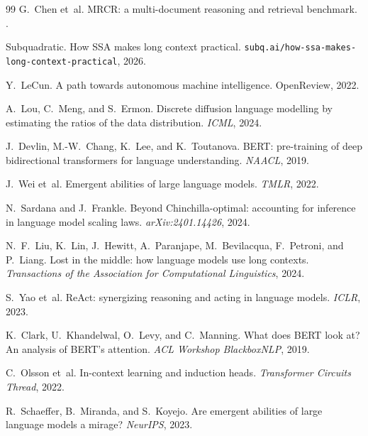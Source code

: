 \begin{thebibliography}{99}
G.~Chen et~al.
\newblock MRCR: a multi-document reasoning and retrieval benchmark.
.

Subquadratic.
\newblock How SSA makes long context practical.
\newblock \texttt{subq.ai/how-ssa-makes-long-context-practical}, 2026.

Y.~LeCun.
\newblock A path towards autonomous machine intelligence.
\newblock OpenReview, 2022.

A.~Lou, C.~Meng, and S.~Ermon.
\newblock Discrete diffusion language modelling by estimating the ratios of
  the data distribution.
\newblock \emph{ICML}, 2024.

J.~Devlin, M.-W.~Chang, K.~Lee, and K.~Toutanova.
\newblock BERT: pre-training of deep bidirectional transformers for language understanding.
\newblock \emph{NAACL}, 2019.

J.~Wei et~al.
\newblock Emergent abilities of large language models.
\newblock \emph{TMLR}, 2022.

N.~Sardana and J.~Frankle.
\newblock Beyond Chinchilla-optimal: accounting for inference in language model scaling laws.
\newblock \emph{arXiv:2401.14426}, 2024.

N.~F.~Liu, K.~Lin, J.~Hewitt, A.~Paranjape, M.~Bevilacqua, F.~Petroni, and P.~Liang.
\newblock Lost in the middle: how language models use long contexts.
\newblock \emph{Transactions of the Association for Computational Linguistics}, 2024.

S.~Yao et~al.
\newblock ReAct: synergizing reasoning and acting in language models.
\newblock \emph{ICLR}, 2023.

K.~Clark, U.~Khandelwal, O.~Levy, and C.~Manning.
\newblock What does BERT look at? An analysis of BERT's attention.
\newblock \emph{ACL Workshop BlackboxNLP}, 2019.

C.~Olsson et~al.
\newblock In-context learning and induction heads.
\newblock \emph{Transformer Circuits Thread}, 2022.

R.~Schaeffer, B.~Miranda, and S.~Koyejo.
\newblock Are emergent abilities of large language models a mirage?
\newblock \emph{NeurIPS}, 2023.


\end{thebibliography}
